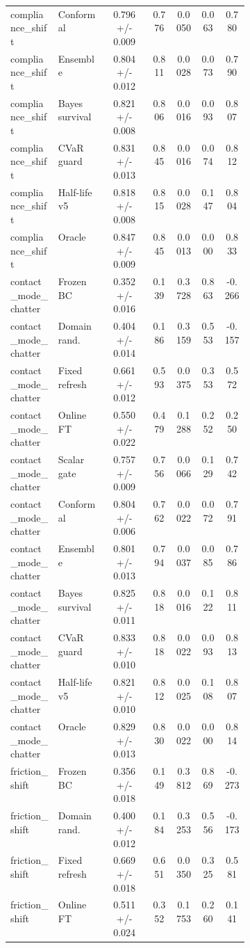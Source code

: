 \documentclass{article}
\begin{document}
\begin{center}
\begin{longtable}{p{0.20\linewidth}p{0.20\linewidth}ccccc}
compliance\_shift & Conformal & 0.796 +/- 0.009 & 0.776 & 0.0050 & 0.063 & 0.780\\
compliance\_shift & Ensemble & 0.804 +/- 0.012 & 0.811 & 0.0028 & 0.073 & 0.790\\
compliance\_shift & Bayes survival & 0.821 +/- 0.008 & 0.806 & 0.0016 & 0.093 & 0.807\\
compliance\_shift & CVaR guard & 0.831 +/- 0.013 & 0.845 & 0.0016 & 0.074 & 0.812\\
compliance\_shift & Half-life v5 & 0.818 +/- 0.008 & 0.815 & 0.0028 & 0.147 & 0.804\\
compliance\_shift & Oracle & 0.847 +/- 0.009 & 0.845 & 0.0013 & 0.000 & 0.833\\
contact\_mode\_chatter & Frozen BC & 0.352 +/- 0.016 & 0.139 & 0.3728 & 0.863 & -0.266\\
contact\_mode\_chatter & Domain rand. & 0.404 +/- 0.014 & 0.186 & 0.3159 & 0.553 & -0.157\\
contact\_mode\_chatter & Fixed refresh & 0.661 +/- 0.012 & 0.593 & 0.0375 & 0.353 & 0.572\\
contact\_mode\_chatter & Online FT & 0.550 +/- 0.022 & 0.479 & 0.1288 & 0.252 & 0.250\\
contact\_mode\_chatter & Scalar gate & 0.757 +/- 0.009 & 0.756 & 0.0066 & 0.129 & 0.742\\
contact\_mode\_chatter & Conformal & 0.804 +/- 0.006 & 0.762 & 0.0022 & 0.072 & 0.791\\
contact\_mode\_chatter & Ensemble & 0.801 +/- 0.013 & 0.794 & 0.0037 & 0.085 & 0.786\\
contact\_mode\_chatter & Bayes survival & 0.825 +/- 0.011 & 0.818 & 0.0016 & 0.122 & 0.811\\
contact\_mode\_chatter & CVaR guard & 0.833 +/- 0.010 & 0.818 & 0.0022 & 0.093 & 0.813\\
contact\_mode\_chatter & Half-life v5 & 0.821 +/- 0.010 & 0.812 & 0.0025 & 0.108 & 0.807\\
contact\_mode\_chatter & Oracle & 0.829 +/- 0.013 & 0.830 & 0.0022 & 0.000 & 0.814\\
friction\_shift & Frozen BC & 0.356 +/- 0.018 & 0.149 & 0.3812 & 0.869 & -0.273\\
friction\_shift & Domain rand. & 0.400 +/- 0.012 & 0.184 & 0.3253 & 0.556 & -0.173\\
friction\_shift & Fixed refresh & 0.669 +/- 0.018 & 0.651 & 0.0350 & 0.325 & 0.581\\
friction\_shift & Online FT & 0.511 +/- 0.024 & 0.352 & 0.1753 & 0.260 & 0.141\\

\end{longtable}
\end{center}
\end{document}
